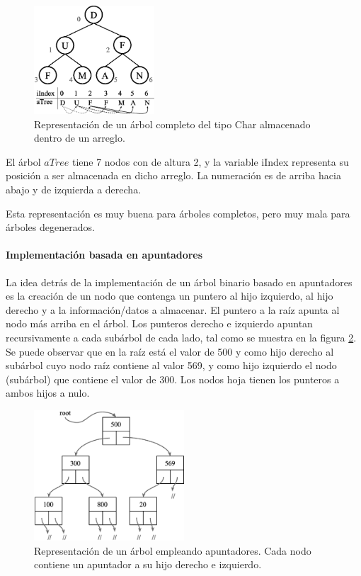 \begin{figure}[htpb!]
  \begin{center}
    \includegraphics[width=0.4\textwidth]{images/vectorbinTree.eps}
  \end{center}
  \caption{Representación de un árbol completo del tipo Char almacenado dentro de un arreglo.}
  \label{fig:vectorbinTree}
\end{figure}

El árbol $aTree$ tiene 7 nodos con de altura 2, y la variable iIndex representa su posición a ser almacenada en dicho arreglo. La numeración es de arriba hacia abajo y de izquierda a derecha.

Esta representación es muy buena para árboles completos, pero muy mala para árboles degenerados.

\paragraph{Implementación basada en apuntadores}

La idea detrás de la implementación de un árbol binario basado en apuntadores es la creación de un nodo que contenga un puntero al hijo izquierdo, al hijo derecho y a la información/datos a almacenar. El puntero a la raíz apunta al nodo más arriba en el árbol. Los punteros derecho e izquierdo apuntan recursivamente a cada subárbol de cada lado, tal como se muestra en la figura \ref{fig:BTPointer}. Se puede observar que en la raíz está el valor de 500 y como hijo derecho al subárbol cuyo nodo raíz contiene al valor 569, y como hijo izquierdo el nodo (subárbol) que contiene el valor de 300. Los nodos hoja tienen los punteros a ambos hijos a nulo.

\begin{figure}[htpb!]
  \begin{center}
    \includegraphics[width=0.5\textwidth]{images/BTPointer.eps}
  \end{center}
  \caption{Representación de un árbol empleando apuntadores. Cada nodo contiene un apuntador a su hijo derecho e izquierdo.}
  \label{fig:BTPointer}
\end{figure}

